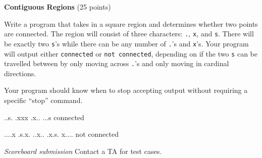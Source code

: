 \documentclass[11pt]{cselabheader}
\theoremstyle{plain}
\begin{document}
\begin{prob}[regions.py]
    \textbf{Contiguous Regions} (25 points)

    Write a program that takes in a square region and determines whether two
    points are connected. The region will consist of three characters: \texttt{.},
    \texttt{x}, and \texttt{s}. There will be exactly two \texttt{s}'s while there
    can be any number of \texttt{.}'s and \texttt{x}'s. Your program will output
    either \texttt{connected} or \texttt{not connected}, depending on if the two
    \texttt{s} can be travelled between by only moving across \texttt{.}'s and only
    moving in cardinal directions.

    Your program should know when to stop accepting output without requiring a specific
    ``stop'' command.

    \begin{verbatimcode}
..s.
.xxx
.x..
...s
connected
    \end{verbatimcode}

    \begin{verbatimcode}
....x
.s.x.
..x..
.x.s.
x....
not connected
    \end{verbatimcode}

    \textit{Scoreboard submission} Contact a TA for test cases.
\end{prob}
    
\end{document}

